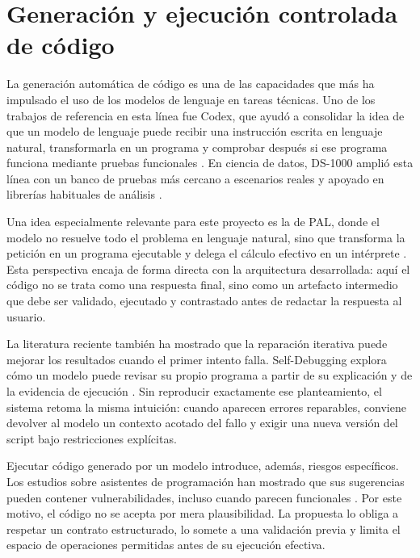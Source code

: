 \section{Generaci\'on y ejecuci\'on controlada de c\'odigo}

La generaci\'on autom\'atica de c\'odigo es una de las capacidades que m\'as ha impulsado el uso de los modelos de lenguaje en tareas t\'ecnicas. Uno de los trabajos de 
referencia en esta l\'inea fue Codex, que ayud\'o a consolidar la idea de que un modelo de lenguaje puede recibir una instrucci\'on escrita en lenguaje natural, 
transformarla en un programa y comprobar despu\'es si ese programa funciona mediante pruebas funcionales \cite{chen2021codex}. En ciencia de datos, DS-1000 ampli\'o esta 
l\'inea con un banco de pruebas m\'as cercano a escenarios reales y apoyado en librer\'ias habituales de an\'alisis \cite{lai2022ds1000}.

Una idea especialmente relevante para este proyecto es la de PAL, donde el modelo no resuelve todo el problema en lenguaje natural, sino que transforma la petici\'on en 
un programa ejecutable y delega el c\'alculo efectivo en un int\'erprete \cite{gao2022pal}. Esta perspectiva encaja de forma directa con la arquitectura desarrollada: 
aqu\'i el c\'odigo no se trata como una respuesta final, sino como un artefacto intermedio que debe ser validado, ejecutado y contrastado antes de redactar la respuesta 
al usuario.

La literatura reciente tambi\'en ha mostrado que la reparaci\'on iterativa puede mejorar los resultados cuando el primer intento falla. Self-Debugging explora c\'omo un 
modelo puede revisar su propio programa a partir de su explicaci\'on y de la evidencia de ejecuci\'on \cite{chen2023selfdebug}. Sin reproducir exactamente ese 
planteamiento, el sistema retoma la misma intuici\'on: cuando aparecen errores reparables, conviene devolver al modelo un contexto acotado del fallo y exigir una nueva 
versi\'on del script bajo restricciones expl\'icitas.

Ejecutar c\'odigo generado por un modelo introduce, adem\'as, riesgos espec\'ificos. Los estudios sobre asistentes de programaci\'on han mostrado que sus sugerencias 
pueden contener vulnerabilidades, incluso cuando parecen funcionales \cite{pearce2022asleep}. Por este motivo, el c\'odigo no se acepta por mera plausibilidad. La 
propuesta lo obliga a respetar un contrato estructurado, lo somete a una validaci\'on previa y limita el espacio de operaciones permitidas antes de su ejecuci\'on 
efectiva.

